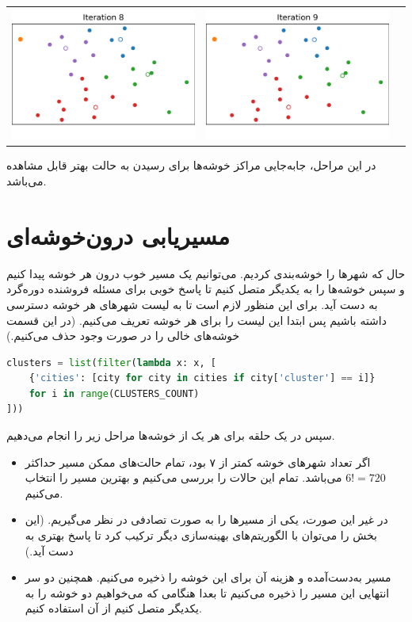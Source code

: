 \documentclass[a4paper, 12pt]{article}
\theoremstyle{definition}
\begin{document}
\begin{center}
\begin{tabular}{ccc}
        \includegraphics[width=.28\textwidth]{1/8.png} &
        \includegraphics[width=.28\textwidth]{1/9.png}   \\
    \end{tabular}
\end{center}
\RTL

در این مراحل، جابه‌جایی مراکز خوشه‌ها برای رسیدن به حالت بهتر قابل مشاهده می‌باشد.

\section{مسیریابی درون‌خوشه‌ای}

حال که شهرها را خوشه‌بندی کردیم. می‌توانیم یک مسیر خوب درون هر خوشه پیدا کنیم و سپس خوشه‌ها را به یکدیگر متصل کنیم تا پاسخ خوبی برای مسئله فروشنده دوره‌گرد به دست آید. برای این منظور لازم است تا به لیست شهرهای هر خوشه دسترسی داشته باشیم پس ابتدا این لیست را برای هر خوشه تعریف می‌کنیم. (در این قسمت خوشه‌های خالی را در صورت وجود حذف می‌کنیم.)


\LTR
\begin{lstlisting}[language=Python]
clusters = list(filter(lambda x: x, [
    {'cities': [city for city in cities if city['cluster'] == i]}
    for i in range(CLUSTERS_COUNT)
]))
\end{lstlisting}
\RTL

سپس در یک حلقه برای هر یک از خوشه‌ها مراحل زیر را انجام می‌دهیم.

\begin{itemize}
    \item اگر تعداد شهرهای خوشه کمتر از ۷ بود، تمام حالت‌های ممکن مسیر حداکثر $6! = 720$ می‌باشد. تمام این حالات را بررسی می‌کنیم و بهترین مسیر را انتخاب می‌کنیم.
    \item در غیر این صورت، یکی از مسیرها را به صورت تصادفی در نظر می‌گیریم. (این بخش را می‌توان با الگوریتم‌های بهینه‌سازی دیگر ترکیب کرد تا پاسخ بهتری به دست آید.)
    \item مسیر به‌دست‌آمده و هزینه آن برای این خوشه را ذخیره می‌کنیم. همچنین دو سر انتهایی این مسیر را ذخیره می‌کنیم تا بعدا هنگامی که می‌خواهیم دو خوشه را به یکدیگر متصل کنیم از آن استفاده کنیم.
\end{itemize}
\end{document}
